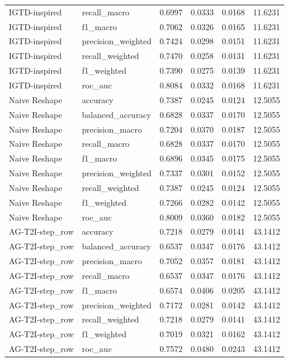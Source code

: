\begin{tabular}{llrrrr}
IGTD-inspired & recall_macro & 0.6997 & 0.0333 & 0.0168 & 11.6231 \\
IGTD-inspired & f1_macro & 0.7062 & 0.0326 & 0.0165 & 11.6231 \\
IGTD-inspired & precision_weighted & 0.7424 & 0.0298 & 0.0151 & 11.6231 \\
IGTD-inspired & recall_weighted & 0.7470 & 0.0258 & 0.0131 & 11.6231 \\
IGTD-inspired & f1_weighted & 0.7390 & 0.0275 & 0.0139 & 11.6231 \\
IGTD-inspired & roc_auc & 0.8084 & 0.0332 & 0.0168 & 11.6231 \\
Naive Reshape & accuracy & 0.7387 & 0.0245 & 0.0124 & 12.5055 \\
Naive Reshape & balanced_accuracy & 0.6828 & 0.0337 & 0.0170 & 12.5055 \\
Naive Reshape & precision_macro & 0.7204 & 0.0370 & 0.0187 & 12.5055 \\
Naive Reshape & recall_macro & 0.6828 & 0.0337 & 0.0170 & 12.5055 \\
Naive Reshape & f1_macro & 0.6896 & 0.0345 & 0.0175 & 12.5055 \\
Naive Reshape & precision_weighted & 0.7337 & 0.0301 & 0.0152 & 12.5055 \\
Naive Reshape & recall_weighted & 0.7387 & 0.0245 & 0.0124 & 12.5055 \\
Naive Reshape & f1_weighted & 0.7266 & 0.0282 & 0.0142 & 12.5055 \\
Naive Reshape & roc_auc & 0.8009 & 0.0360 & 0.0182 & 12.5055 \\
AG-T2I-step_row & accuracy & 0.7218 & 0.0279 & 0.0141 & 43.1412 \\
AG-T2I-step_row & balanced_accuracy & 0.6537 & 0.0347 & 0.0176 & 43.1412 \\
AG-T2I-step_row & precision_macro & 0.7052 & 0.0357 & 0.0181 & 43.1412 \\
AG-T2I-step_row & recall_macro & 0.6537 & 0.0347 & 0.0176 & 43.1412 \\
AG-T2I-step_row & f1_macro & 0.6574 & 0.0406 & 0.0205 & 43.1412 \\
AG-T2I-step_row & precision_weighted & 0.7172 & 0.0281 & 0.0142 & 43.1412 \\
AG-T2I-step_row & recall_weighted & 0.7218 & 0.0279 & 0.0141 & 43.1412 \\
AG-T2I-step_row & f1_weighted & 0.7019 & 0.0321 & 0.0162 & 43.1412 \\
AG-T2I-step_row & roc_auc & 0.7572 & 0.0480 & 0.0243 & 43.1412 \\

\end{tabular}
